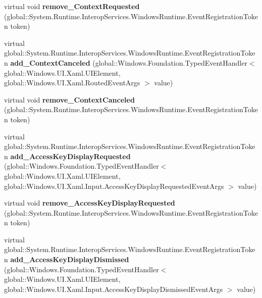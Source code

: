 \begin{DoxyCompactItemize}
virtual void {\bfseries remove\+\_\+\+Context\+Requested} (global\+::\+System.\+Runtime.\+Interop\+Services.\+Windows\+Runtime.\+Event\+Registration\+Token token)
\item 
\mbox{\label{class_windows_1_1_u_i_1_1_xaml_1_1_u_i_element_a10d84028f6f428f4a5c1fe8fe9501deb}} 
virtual global\+::\+System.\+Runtime.\+Interop\+Services.\+Windows\+Runtime.\+Event\+Registration\+Token {\bfseries add\+\_\+\+Context\+Canceled} (global\+::\+Windows.\+Foundation.\+Typed\+Event\+Handler$<$ global\+::\+Windows.\+U\+I.\+Xaml.\+U\+I\+Element, global\+::\+Windows.\+U\+I.\+Xaml.\+Routed\+Event\+Args $>$ value)
\item 
\mbox{\label{class_windows_1_1_u_i_1_1_xaml_1_1_u_i_element_a62c78b7595f4771d8fae8188641db45e}} 
virtual void {\bfseries remove\+\_\+\+Context\+Canceled} (global\+::\+System.\+Runtime.\+Interop\+Services.\+Windows\+Runtime.\+Event\+Registration\+Token token)
\item 
\mbox{\label{class_windows_1_1_u_i_1_1_xaml_1_1_u_i_element_a33aadbdcdc9a08239adba0ea7ca3dc2c}} 
virtual global\+::\+System.\+Runtime.\+Interop\+Services.\+Windows\+Runtime.\+Event\+Registration\+Token {\bfseries add\+\_\+\+Access\+Key\+Display\+Requested} (global\+::\+Windows.\+Foundation.\+Typed\+Event\+Handler$<$ global\+::\+Windows.\+U\+I.\+Xaml.\+U\+I\+Element, global\+::\+Windows.\+U\+I.\+Xaml.\+Input.\+Access\+Key\+Display\+Requested\+Event\+Args $>$ value)
\item 
\mbox{\label{class_windows_1_1_u_i_1_1_xaml_1_1_u_i_element_aa685659f05df9a84a04f9b4fba77ddf8}} 
virtual void {\bfseries remove\+\_\+\+Access\+Key\+Display\+Requested} (global\+::\+System.\+Runtime.\+Interop\+Services.\+Windows\+Runtime.\+Event\+Registration\+Token token)
\item 
\mbox{\label{class_windows_1_1_u_i_1_1_xaml_1_1_u_i_element_a15fc48463bdeec03ee1aee7533f254f0}} 
virtual global\+::\+System.\+Runtime.\+Interop\+Services.\+Windows\+Runtime.\+Event\+Registration\+Token {\bfseries add\+\_\+\+Access\+Key\+Display\+Dismissed} (global\+::\+Windows.\+Foundation.\+Typed\+Event\+Handler$<$ global\+::\+Windows.\+U\+I.\+Xaml.\+U\+I\+Element, global\+::\+Windows.\+U\+I.\+Xaml.\+Input.\+Access\+Key\+Display\+Dismissed\+Event\+Args $>$ value)

\end{DoxyCompactItemize}
